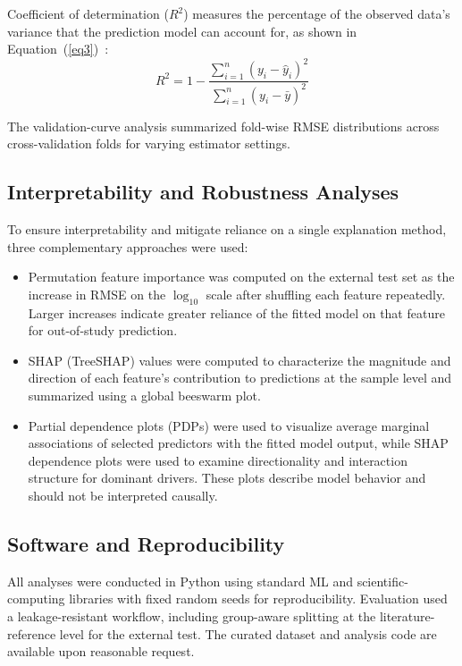\documentclass[10pt]{NSP1}
\begin{document}
Coefficient of determination ($R^2$) measures the percentage of the observed data's variance that
the prediction model can account for, as shown in Equation~(\ref{eq3})~\cite{ref31}:
\begin{equation}\label{eq3}
R^2 = 1 - \frac{\displaystyle\sum_{i=1}^{n}\left(y_i - \hat{y}_i\right)^2}
                {\displaystyle\sum_{i=1}^{n}\left(y_i - \bar{y}\right)^2}
\end{equation}

The validation-curve analysis summarized fold-wise RMSE distributions across cross-validation folds
for varying estimator settings.

\subsection{Interpretability and Robustness Analyses}

To ensure interpretability and mitigate reliance on a single explanation method, three
complementary approaches were used:
\begin{itemize}
\item Permutation feature importance was computed on the external test set as the increase in RMSE
on the $\log_{10}$ scale after shuffling each feature repeatedly. Larger increases indicate greater
reliance of the fitted model on that feature for out-of-study prediction.
\item SHAP (TreeSHAP) values were computed to characterize the magnitude and direction of each
feature's contribution to predictions at the sample level and summarized using a global beeswarm
plot.
\item Partial dependence plots (PDPs) were used to visualize average marginal associations of
selected predictors with the fitted model output, while SHAP dependence plots were used to examine
directionality and interaction structure for dominant drivers. These plots describe model behavior
and should not be interpreted causally.
\end{itemize}

\subsection{Software and Reproducibility}

All analyses were conducted in Python using standard ML and scientific-computing libraries with
fixed random seeds for reproducibility. Evaluation used a leakage-resistant workflow, including
group-aware splitting at the literature-reference level for the external test. The curated dataset
and analysis code are available upon reasonable request.
\end{document}
